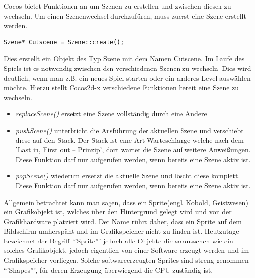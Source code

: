 
Cocos bietet Funktionen an um Szenen zu erstellen und zwischen diesen zu wechseln. Um einen Szenenwechsel durchzufüren, muss zuerst eine Szene erstellt werden.

\begin{lstlisting}[style=singleline]
	Szene* Cutscene = Szene::create();
\end{lstlisting}


Dies erstellt ein Objekt des Typ Szene mit dem Namen Cutscene.
Im Laufe des Spiels ist es  notwendig zwischen den verschiedenen Szenen zu wechseln. Dies wird deutlich, wenn man z.B. ein neues Spiel starten oder ein anderes Level auswählen möchte. Hierzu stellt Cocos2d-x verschiedene Funktionen bereit eine Szene zu wechseln.

\begin{itemize}
\item \textit{replaceScene()} ersetzt eine Szene vollständig durch eine Andere
\item \textit{pushScene()} unterbricht die Ausführung der aktuellen Szene und verschiebt diese auf den Stack. Der Stack ist eine Art Warteschlange welche nach dem 'Last in, First out – Prinzip', dort wartet die Szene auf weitere Anweißungen. Diese Funktion darf nur aufgerufen werden, wenn bereits eine Szene aktiv ist.
\item \textit{popScene()} wiederum ersetzt die aktuelle Szene und löscht diese komplett. Diese Funktion darf nur aufgerufen werden, wenn bereits eine Szene aktiv ist.
\end{itemize}



\label{sec:2_Spriteprinzip}
Allgemein betrachtet kann man sagen, dass ein Sprite(engl. Kobold, Geistwesen) ein Grafikobjekt ist, welches über den Hintergrund gelegt wird und von der Grafikhardware platziert wird. 
Der Name rührt daher, dass ein Sprite auf dem Bildschirm umherspäht und im Grafikspeicher nicht zu finden ist. Heutzutage bezeichnet der Begriff “'Sprite”' jedoch alle Objekte die so aussehen wie ein solches Grafikobjekt, jedoch eigentlich von einer Software erzeugt werden und im Grafikspeicher vorliegen. 
Solche softwareerzeugten Sprites sind streng genommen “'Shapes”', für deren Erzeugung überwiegend die CPU zuständig ist.
 
